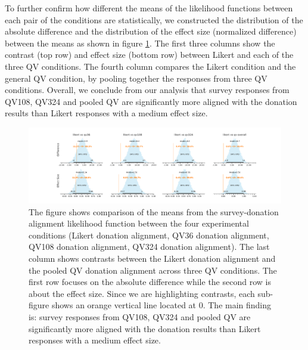 To further confirm how different the means 
of the likelihood functions 
between each pair of the conditions are statistically, 
we constructed the distribution 
of the absolute difference and 
the distribution of the effect size 
(normalized difference) 
between the means as shown in figure \ref{fig:contrast_exp1}. The first three columns show the contrast (top row) and effect size (bottom row) between Likert and each of the three QV conditions. The fourth column compares the Likert condition and the general QV condition, by pooling together the responses from three QV conditions. Overall, we conclude from our analysis that survey responses from QV108, QV324 and pooled QV are significantly more aligned with the donation results than Likert responses with a medium effect size. 

\begin{figure}[htpb]
  \centering
  \includegraphics[trim= 2in 0in 2in 0in, clip, width=\textwidth, keepaspectratio=true]{"content/image/Votes_vs_Absolute_Donation_StudentT_differences_and_effects.pdf"}
  \caption{
    The figure shows comparison of the means from the survey-donation alignment likelihood function between the four experimental conditions (Likert donation alignment, QV36 donation alignment, QV108 donation alignment, QV324 donation alignment). The last column shows contrasts between the Likert donation alignment and the pooled QV donation alignment across three QV conditions. The first row focuses on the absolute difference while the second row is about the effect size. Since we are highlighting contrasts, each sub-figure shows an orange vertical line located at 0. The main finding is: survey responses from QV108, QV324 and pooled QV are significantly more aligned with the donation results than Likert responses with a medium effect size.
  }
  \label{fig:contrast_exp1}
\end{figure}

